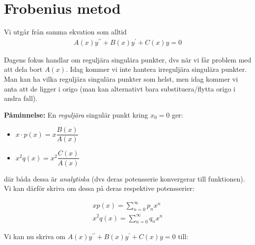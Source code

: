 \section{Frobenius metod}
\par\bigskip
\noindent Vi utgår från samma ekvation som alltid
\begin{equation*}
  \begin{gathered}
    A(x)y^{\prime\prime}+B(x)y^{\prime}+C(x)y=0
  \end{gathered}
\end{equation*}\par
\noindent Dagens fokus handlar om reguljära singulära punkter, dvs när vi får problem med att dela bort $A(x)$. Idag kommer vi inte hantera irreguljära singulära punkter. Man kan ha vilka reguljära singulära punkter som helst, men idag kommer vi anta att de ligger i origo (man kan alternativt bara substituera/flytta origo i andra fall).
\par\bigskip
\noindent \textbf{Påminnelse:} En \textit{reguljära} singulär punkt kring $x_0 = 0$ ger:
\begin{itemize}
  \item $x\cdot p(x) = x\dfrac{B(x)}{A(x)}$
  \item $x^2q(x)=x^2\dfrac{C(x)}{A(x)}$
\end{itemize}\par\bigskip
\noindent där båda dessa är \textit{analytiska} (dvs deras potensserie konvergerar till funktionen). Vi kan därför skriva om dessa på deras respektive potensserier:


\begin{equation*}
  \begin{gathered}
    xp(x) = \sum_{n=0}^{\infty}p_nx^n\\
    x^2q(x)=\sum_{n=0}^{\infty}q_nx^n
  \end{gathered}
\end{equation*}
\par\bigskip
\noindent Vi kan nu skriva om  $A(x)y^{\prime\prime}+B(x)y^{\prime}+C(x)y=0$ till:



